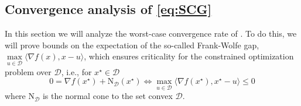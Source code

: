 \begin{toappendix}

\subsection{Convergence analysis of \ref{eq:SCG}}\label{subsec:SCG}

In this section we will analyze the worst-case convergence rate of . To do this, we will prove bounds on the expectation of the so-called Frank-Wolfe gap, $\max\limits_{u\in\mathcal{D}} \langle \nabla f(x), x-u\rangle$, which ensures criticality for the constrained optimization problem over $\mathcal{D}$, i.e., for $x^\star\in\mathcal{D}$
\begin{equation*}
    0 = \nabla f(x^\star) + \mathrm{N}_{\mathcal{D}}(x^\star) \iff \max\limits_{u\in\mathcal{D}} \langle \nabla f(x^\star), x^\star-u\rangle \leq 0
\end{equation*}
where $\mathrm{N}_{\mathcal{D}}$ is the normal cone to the set convex $\mathcal{D}$.


\end{toappendix}
